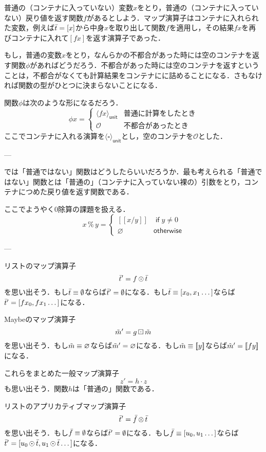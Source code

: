\documentclass[twocolumn]{jsbook}
\def\[{\left[\!\left[}
\def\]{\right]\!\right]}
\DeclareMathOperator{\hsklApplicativeListMap}{\otimes}
\DeclareMathOperator{\hsklFmap}{\cdot}
\DeclareMathOperator{\hsklMap}{\odot}
\DeclareMathOperator{\hsklMaybeMap}{\boxdot}
\newcommand{\hsklEmptyList}{\emptyset}
\newcommand{\hsklNothing}{\varnothing}
\newcommand{\hsklJust}[1]{\[#1\]}
\newcommand{\hsklUnit}[1]{\langle#1\rangle_\textsf{unit}}
\newcommand{\hsklList}[1]{\Bar{#1}}
\newcommand{\hsklMaybe}[1]{\Tilde{#1}}
\newcommand{\mathKeyword}[1]{\mathsf{#1}}
\DeclareMathOperator{\mathIf}{\mathKeyword{if}}
\newcommand{\mathOtherwise}{\mathKeyword{otherwise}}
\newcommand{\mathSomething}{\square}
\begin{document}
普通の（コンテナに入っていない）変数$x$をとり，普通の（コンテナに入っていない）戻り値を返す関数$f$があるとしよう．マップ演算子はコンテナに入れられた変数，例えば$\hsklList{t}=[x]$から中身$x$を取り出して関数$f$を適用し，その結果$fx$を再びコンテナに入れて$[fx]$を返す演算子であった．

もし，普通の変数$x$をとり，なんらかの不都合があった時には空のコンテナを返す関数$\phi$があればどうだろう．不都合があった時には空のコンテナを返すということは，不都合がなくても計算結果をコンテナにに詰めることになる．さもなければ関数の型がひとつに決まらないことになる．

関数$\phi$は次のような形になるだろう．
$$\phi x=\begin{cases}\hsklUnit{fx}&\text{普通に計算をしたとき}\\
\mathcal{O}&\text{不都合があったとき}\end{cases}$$
ここでコンテナに入れる演算を$\hsklUnit{\mathSomething}$とし，空のコンテナを$\mathcal{O}$とした．

---

では「普通ではない」関数はどうしたらいいだろうか．最も考えられる「普通ではない」関数とは「普通の」（コンテナに入っていない裸の）引数をとり，コンテナにつめた戻り値を返す関数である．

ここでようやく$0$除算の課題を扱える．
$$x\mathop{\%}y=\begin{cases}
\hsklJust{x/y}&\mathIf y\neq0\\
\hsklNothing&\mathOtherwise
\end{cases}
$$

---

リストのマップ演算子$$\hsklList{t}'=f\hsklMap\hsklList{t}$$を思い出そう．もし$\hsklList{t}\equiv\hsklEmptyList$ならば$\hsklList{t}'=\hsklEmptyList$になる．もし$\hsklList{t}\equiv[x_0,x_1\dots]$ならば$\hsklList{t}'=[fx_0,fx_1\dots]$になる．

Maybeのマップ演算子$$\hsklMaybe{m}'=g\hsklMaybeMap\hsklMaybe{m}$$を思い出そう．もし$\hsklMaybe{m}\equiv\hsklNothing$ならば$\hsklMaybe{m}'=\hsklNothing$になる．もし$\hsklMaybe{m}\equiv\hsklJust{y}$ならば$\hsklMaybe{m}'=\hsklJust{fy}$になる．

これらをまとめた一般マップ演算子$$z'=h\hsklFmap z$$も思い出そう．関数$h$は「普通の」関数である．

リストのアプリカティブマップ演算子$$\hsklList{t}'=\hsklList{f}\hsklApplicativeListMap\hsklList{t}$$を思い出そう．もし$\hsklList{f}\equiv\hsklEmptyList$ならば$\hsklList{t}'=\hsklEmptyList$になる．もし$\hsklList{f}\equiv[u_0,u_1\dots]$ならば$\hsklList{t}'=[u_0\hsklMap\hsklList{t},u_1\hsklMap\hsklList{t}\dots]$になる．
\end{document}
